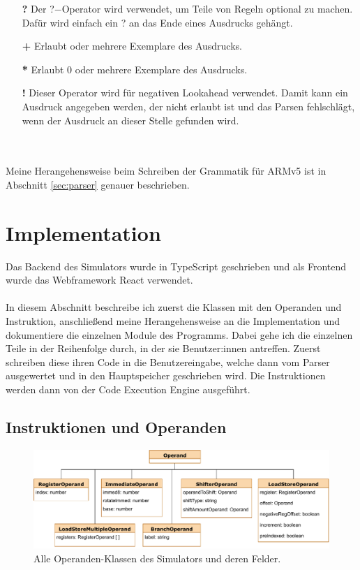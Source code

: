 \documentclass[a4paper, 11pt, onecolumn]{article}
\begin{document}
\begin{itemize}[labelwidth=2em,leftmargin =\dimexpr{}+\relax, align=parleft]
\item[{\textbf{?}}] Der ?$-$Operator wird verwendet, um Teile von Regeln optional zu machen. Dafür wird einfach ein ? an das Ende eines Ausdrucks gehängt.
\item[{\textbf{+}}] Erlaubt oder mehrere Exemplare des Ausdrucks.
\item[{\textbf{*}}] Erlaubt 0 oder mehrere Exemplare des Ausdrucks.
\item[{\textbf{!}}] Dieser Operator wird für negativen Lookahead verwendet. Damit kann ein Ausdruck angegeben werden, der nicht erlaubt ist und das Parsen fehlschlägt, wenn der Ausdruck an dieser Stelle gefunden wird.
\end{itemize}
~\\ \\ \noindent
Meine Herangehensweise beim Schreiben der Grammatik für ARMv5 ist in Abschnitt \ref{sec:parser} genauer beschrieben.

\newpage
\section{Implementation}

Das Backend des Simulators wurde in TypeScript \cite{typescript}\cite{understandingtypescript} geschrieben und als Frontend wurde das Webframework React \cite{react} verwendet.\\ \\
In diesem Abschnitt beschreibe ich zuerst die Klassen mit den Operanden und Instruktion, anschließend meine Herangehensweise an die Implementation und dokumentiere die einzelnen Module des Programms. Dabei gehe ich die einzelnen Teile in der Reihenfolge durch, in der sie Benutzer:innen antreffen. Zuerst schreiben diese ihren Code in die Benutzereingabe, welche dann vom Parser ausgewertet und in den Hauptspeicher geschrieben wird. Die Instruktionen werden dann von der Code Execution Engine ausgeführt.

\subsection{Instruktionen und Operanden}\label{sec:instAndOps}

\begin{figure}[!htb]
\centering
\includegraphics[width=1\textwidth]{data/operands}
\caption{Alle Operanden-Klassen des Simulators und deren Felder.}
\label{fig:operands}
\end{figure}
\end{document}

